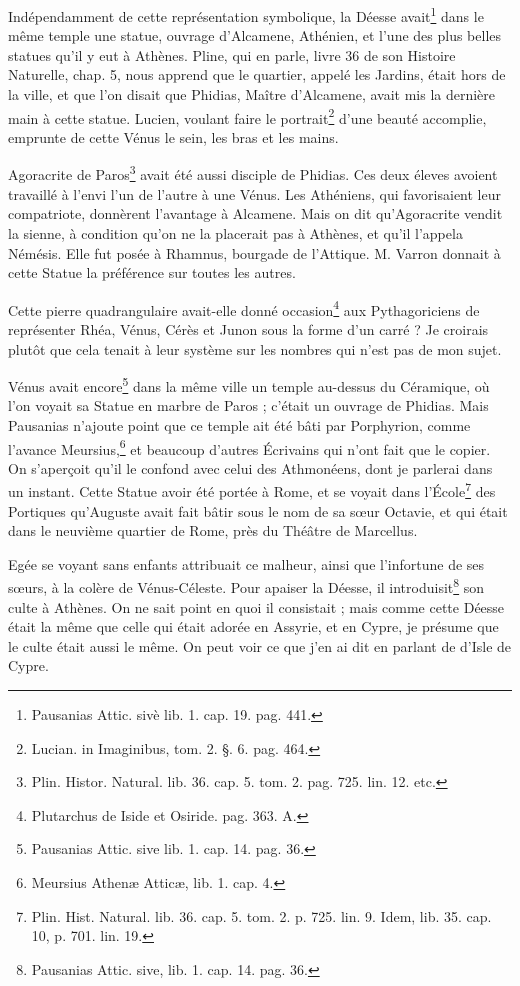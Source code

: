 \documentclass[a4paper, 18pt, oneside]{article}
\begin{document}
Indépendamment de cette représentation symbolique, la Déesse avait\footnote{Pausanias Attic. sivè lib. 1. cap. 19. pag. 441.} dans le même temple une statue, ouvrage d'Alcamene, Athénien, et l'une des plus belles statues qu'il y eut à Athènes. Pline, qui en parle, livre 36 de son Histoire Naturelle, chap. 5, nous apprend que le quartier, appelé les Jardins, était hors de la ville, et que l'on disait que Phidias, Maître d'Alcamene, avait mis la dernière main à cette statue. Lucien, voulant faire le portrait\footnote{Lucian. in Imaginibus, tom. 2. §. 6. pag. 464.} d'une beauté accomplie, emprunte de cette Vénus le sein, les bras et les mains.

Agoracrite de Paros\footnote{Plin. Histor. Natural. lib. 36. cap. 5. tom. 2. pag. 725. lin. 12. etc.} avait été aussi disciple de Phidias. Ces deux éleves avoient travaillé à l'envi l'un de l'autre à une Vénus. Les Athéniens, qui favorisaient leur compatriote, donnèrent l'avantage à Alcamene. Mais on dit qu'Agoracrite vendit la sienne, à condition qu'on ne la placerait pas à Athènes, et qu'il l'appela Némésis. Elle fut posée à Rhamnus, bourgade de l'Attique. M. Varron donnait à cette Statue la préférence sur toutes les autres.

Cette pierre quadrangulaire avait-elle donné occasion\footnote{Plutarchus de Iside et Osiride. pag. 363. A.} aux Pythagoriciens de représenter Rhéa, Vénus, Cérès et Junon sous la forme d'un carré ? Je croirais plutôt que cela tenait à leur système sur les nombres qui n'est pas de mon sujet.

Vénus avait encore\footnote{Pausanias Attic. sive lib. 1. cap. 14. pag. 36.} dans la même ville un temple au-dessus du Céramique, où l'on voyait sa Statue en marbre de Paros ; c'était un ouvrage de Phidias. Mais Pausanias n'ajoute point que ce temple ait été bâti par Porphyrion, comme l'avance Meursius,\footnote{Meursius Athenæ Atticæ, lib. 1. cap. 4.} et beaucoup d'autres Écrivains qui n'ont fait que le copier. On s'aperçoit qu'il le confond avec celui des Athmonéens, dont je parlerai dans un instant. Cette Statue avoir été portée à Rome, et se voyait dans l'École\footnote{Plin. Hist. Natural. lib. 36. cap. 5. tom. 2. p. 725. lin. 9. Idem, lib. 35. cap. 10, p. 701. lin. 19.} des Portiques qu'Auguste avait fait bâtir sous le nom de sa sœur Octavie, et qui était dans le neuvième quartier de Rome, près du Théâtre de Marcellus.

Egée se voyant sans enfants attribuait ce malheur, ainsi que l'infortune de ses sœurs, à la colère de Vénus-Céleste. Pour apaiser la Déesse, il introduisit\footnote{Pausanias Attic. sive, lib. 1. cap. 14. pag. 36.} son culte à Athènes. On ne sait point en quoi il consistait ; mais comme cette Déesse était la même que celle qui était adorée en Assyrie, et en Cypre, je présume que le culte était aussi le même. On peut voir ce que j'en ai dit en parlant de d'Isle de Cypre.
\end{document}
